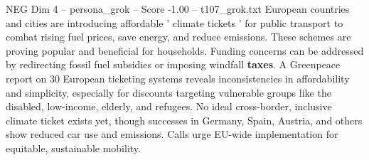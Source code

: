\begin{textsample}{NEG Dim 4 – persona\_grok – Score -1.00 – t107\_grok.txt}  \label{ex:f4_neg_023}
European countries and cities are introducing affordable ' climate tickets ' for public transport to combat rising fuel prices, save energy, and reduce emissions.
These schemes are proving popular and beneficial for households.
Funding concerns can be addressed by redirecting fossil fuel subsidies or imposing windfall \textbf{taxes}.
A Greenpeace report on 30 European ticketing systems reveals inconsistencies in affordability and simplicity, especially for discounts targeting vulnerable groups like the disabled, low-income, elderly, and refugees.
No ideal cross-border, inclusive climate ticket exists yet, though successes in Germany, Spain, Austria, and others show reduced car use and emissions.
Calls urge EU-wide implementation for equitable, sustainable mobility.

\end{textsample}
